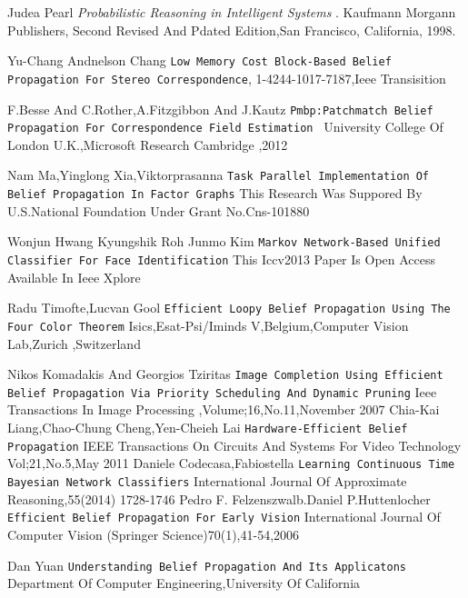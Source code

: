 \documentclass{raitdisser}
\begin{document}
\begin{thebibliography}{9}
Judea Pearl
\textit{Probabilistic Reasoning in Intelligent Systems }.
Kaufmann Morgann Publishers, Second Revised And Pdated Edition,San Francisco, California, 1998.

Yu-Chang Andnelson Chang
\texttt{Low Memory Cost Block-Based Belief Propagation For Stereo Correspondence},
1-4244-1017-7187,Ieee Transisition

F.Besse And C.Rother,A.Fitzgibbon And J.Kautz
\texttt{Pmbp:Patchmatch Belief Propagation For Correspondence Field Estimation }
University  College Of London U.K.,Microsoft Research Cambridge ,2012

Nam Ma,Yinglong Xia,Viktorprasanna
\texttt{Task Parallel Implementation Of Belief Propagation In Factor Graphs}
This Research Was Suppored By U.S.National Foundation Under Grant No.Cns-101880

Wonjun Hwang Kyungshik Roh Junmo Kim
\texttt{Markov Network-Based Unified Classifier For Face Identification}
This Iccv2013 Paper Is Open Access Available In Ieee Xplore

Radu Timofte,Lucvan Gool
\texttt{Efficient Loopy Belief Propagation Using The Four Color Theorem}
Isics,Esat-Psi/Iminds V,Belgium,Computer Vision Lab,Zurich ,Switzerland

Nikos Komadakis And Georgios Tziritas
\texttt{Image Completion Using Efficient Belief Propagation Via Priority Scheduling And Dynamic Pruning}
Ieee Transactions In Image Processing ,Volume;16,No.11,November 2007
Chia-Kai Liang,Chao-Chung Cheng,Yen-Cheieh Lai
\texttt{Hardware-Efficient Belief Propagation}
IEEE Transactions On Circuits And Systems For Video Technology Vol;21,No.5,May 2011
Daniele Codecasa,Fabiostella
\texttt{Learning Continuous Time Bayesian Network Classifiers}
International Journal Of Approximate Reasoning,55(2014) 1728-1746
Pedro F. Felzenszwalb.Daniel P.Huttenlocher
\texttt{Efficient Belief Propagation For Early Vision}
International Journal Of Computer Vision (Springer Science)70(1),41-54,2006

Dan Yuan
\texttt{Understanding Belief Propagation And Its Applicatons}
Department Of Computer Engineering,University Of California


\end{thebibliography}
\end{document}

